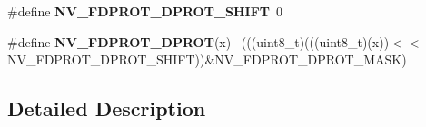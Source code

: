 \begin{DoxyCompactItemize}
\item 
\hypertarget{group___n_v___register___masks_gaf2019bf7c0b8e9dc5efcc385cc50f35b}{}\#define {\bfseries N\+V\+\_\+\+F\+D\+P\+R\+O\+T\+\_\+\+D\+P\+R\+O\+T\+\_\+\+S\+H\+I\+F\+T}~0\label{group___n_v___register___masks_gaf2019bf7c0b8e9dc5efcc385cc50f35b}

\item 
\hypertarget{group___n_v___register___masks_gaf8d86f0c12ae901350923c42b1c0dbbe}{}\#define {\bfseries N\+V\+\_\+\+F\+D\+P\+R\+O\+T\+\_\+\+D\+P\+R\+O\+T}(x)                                          ~(((uint8\+\_\+t)(((uint8\+\_\+t)(x))$<$$<$N\+V\+\_\+\+F\+D\+P\+R\+O\+T\+\_\+\+D\+P\+R\+O\+T\+\_\+\+S\+H\+I\+F\+T))\&N\+V\+\_\+\+F\+D\+P\+R\+O\+T\+\_\+\+D\+P\+R\+O\+T\+\_\+\+M\+A\+S\+K)\label{group___n_v___register___masks_gaf8d86f0c12ae901350923c42b1c0dbbe}

\end{DoxyCompactItemize}


\subsection{Detailed Description}
